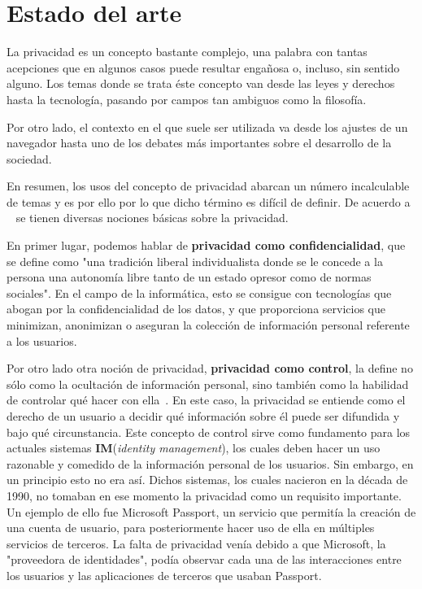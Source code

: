 \chapter{Estado del arte}
\label{chap:estadodelarte}

\label{sec:conceptos}
La privacidad es un concepto bastante complejo, una palabra con tantas acepciones que en algunos casos puede resultar engañosa o, incluso, sin sentido alguno. Los temas donde se trata éste concepto van desde las leyes y derechos hasta la tecnología, pasando por campos tan ambiguos como la filosofía.

Por otro lado, el contexto en el que suele ser utilizada va desde los ajustes de un navegador hasta uno de los debates más importantes sobre el desarrollo de la sociedad.

En resumen, los usos del concepto de privacidad abarcan un número incalculable de temas y es por ello por lo que dicho término es difícil de definir. De acuerdo a ~\cite{article:danezis2010} se tienen diversas nociones básicas sobre la privacidad.

En primer lugar, podemos hablar de \textbf{privacidad como confidencialidad}, que se define como "una tradición liberal individualista donde se le concede a la persona una autonomía libre tanto de un estado opresor como de normas sociales". En el campo de la informática, esto se consigue con tecnologías que abogan por la confidencialidad de los datos, y que proporciona servicios que minimizan, anonimizan o aseguran la colección de información personal referente a los usuarios.

Por otro lado otra noción de privacidad, \textbf{privacidad como control}, la define no sólo como la ocultación de información personal, sino también como la habilidad de controlar qué hacer con ella~\cite{lane2014privacy}.  En este caso, la privacidad se entiende como el derecho de un usuario a decidir qué información sobre él puede ser difundida y bajo qué circunstancia. Este concepto de control sirve como fundamento para los actuales sistemas \textbf{IM}(\textit{identity management}), los cuales deben hacer un uso razonable y  comedido de la información personal de los usuarios. Sin embargo, en un principio esto no era así. 
Dichos sistemas, los cuales nacieron en la década de 1990, no tomaban en ese momento la privacidad como un requisito importante. Un ejemplo de ello fue Microsoft Passport, un servicio que permitía la creación de una cuenta de usuario, para posteriormente hacer uso de ella en múltiples servicios de terceros. La falta de privacidad venía debido a que Microsoft, la "proveedora de identidades", podía observar cada una de las interacciones entre los usuarios y las aplicaciones de terceros que usaban Passport.

